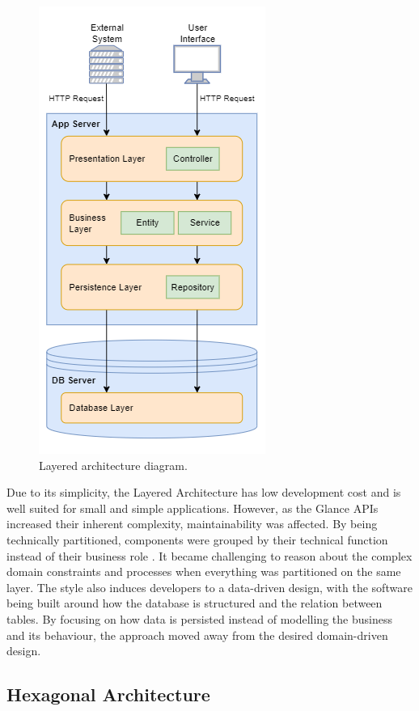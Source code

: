 \begin{figure}[htbp]
  \centering
  \includegraphics[scale=0.55]{Imagens/chap04/layered-architecture-on-frapi.png}
  \caption{Layered architecture diagram.}
  \label{fig:layered-architecture-on-frapi}
\end{figure}

Due to its simplicity, the Layered Architecture has low development cost and is well suited for small and simple applications. However, as the Glance APIs increased their inherent complexity, maintainability was affected. By being technically partitioned, components were grouped by their technical function instead of their business role \cite{richards-architecture}. It became challenging to reason about the complex domain constraints and processes when everything was partitioned on the same layer. The style also induces developers to a data-driven design, with the software being built around how the database is structured and the relation between tables. By focusing on how data is persisted instead of modelling the business and its behaviour, the approach moved away from the desired domain-driven design.

\subsection{Hexagonal Architecture}
\label{sec:ports-and-adapters}

